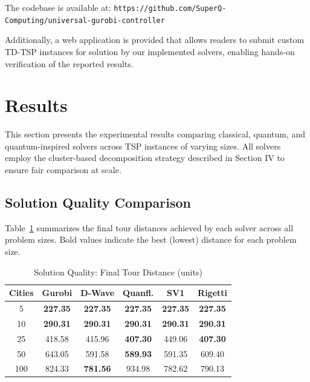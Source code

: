 \documentclass[conference]{IEEEtran}
\begin{document}
The codebase is available at: \texttt{https://github.com/SuperQ-Computing/universal-gurobi-controller}

Additionally, a web application is provided that allows readers to submit custom TD-TSP instances for solution by our implemented solvers, enabling hands-on verification of the reported results.

\section{Results}

This section presents the experimental results comparing classical, quantum, and quantum-inspired solvers across TSP instances of varying sizes. All solvers employ the cluster-based decomposition strategy described in Section IV to ensure fair comparison at scale.

\subsection{Solution Quality Comparison}

Table~\ref{tab:results_quality} summarizes the final tour distances achieved by each solver across all problem sizes. Bold values indicate the best (lowest) distance for each problem size.

\begin{table}[htbp]
\caption{Solution Quality: Final Tour Distance (units)}
\begin{center}
\begin{tabular}{|c|c|c|c|c|c|}
\hline
\textbf{Cities} & \textbf{Gurobi} & \textbf{D-Wave} & \textbf{Quanfl.} & \textbf{SV1} & \textbf{Rigetti} \\
\hline
5 & \textbf{227.35} & \textbf{227.35} & \textbf{227.35} & \textbf{227.35} & \textbf{227.35} \\
\hline
10 & \textbf{290.31} & \textbf{290.31} & \textbf{290.31} & \textbf{290.31} & \textbf{290.31} \\
\hline
25 & 418.58 & 415.96 & \textbf{407.30} & 449.06 & \textbf{407.30} \\
\hline
50 & 643.05 & 591.58 & \textbf{589.93} & 591.35 & 609.40 \\
\hline
100 & 824.33 & \textbf{781.56} & 934.98 & 782.62 & 790.13 \\
\hline
\end{tabular}
\label{tab:results_quality}
\end{center}
\end{table}
\end{document}
